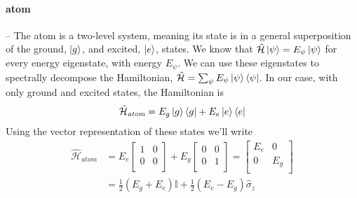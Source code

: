 \paragraph*{atom}--\quad
The atom is a two-level system, meaning its state is in a general superposition of the ground, $\ket{g}$, and excited, $\ket{e}$, states. We know that $\hat{\mathcal{H}}\ket{\psi} = E_\psi \ket{\psi}$ for every energy eigenstate, with energy $E_\psi$. We can use these eigenstates to spectrally decompose the Hamiltonian, $\hat{\mathcal{H}} = \sum_\psi E_\psi \ket{\psi}\bra{\psi}$. In our case, with only ground and excited states, the Hamiltonian is
\begin{equation}
    \hat{\mathcal{H}}_{\textit{atom}} = E_g\ket{g}\bra{g} + E_e\ket{e}\bra{e}
\end{equation}
Using the vector representation of these states we'll write
\begin{align*} 
    \hat{\mathcal{H}}_{\textit{atom}} &= 
    E_e \begin{bmatrix}
    1 & 0     \\
    0   & 0   \\
    \end{bmatrix}
    + E_g \begin{bmatrix}
    0 & 0     \\
    0   & 1   \\
    \end{bmatrix} = 
    \begin{bmatrix}
    E_e & 0     \\
    0   & E_g   \\
    \end{bmatrix} \\
    &= \frac{1}{2} (E_g + E_e)\mathbb{I} + \frac{1}{2} (E_e - E_g)\hat{\sigma}_z
\end{align*}
